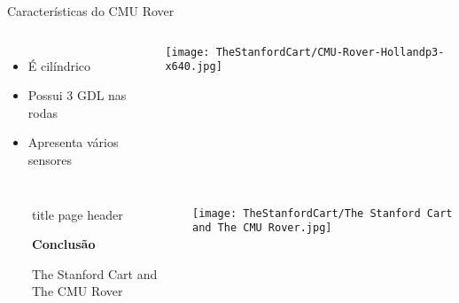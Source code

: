 \begin{frame}[c]{Características do CMU Rover}
    \begin{columns}
        \begin{itemize} 
            \item É cilíndrico
            \item Possui 3 GDL nas rodas
            \item Apresenta vários sensores
        \end{itemize}
            \centering
                \texttt{[image: TheStanfordCart/CMU-Rover-Hollandp3-x640.jpg]}
            \end{columns}
\end{frame}
\begin{frame}
    \begin{columns}
        ~\hfill
            \begin{beamercolorbox}[sep=8em, colsep*=18pt, wd=\textwidth,ht=\paperheight]{title page header}
                \begin{center}
                    \textbf{\huge{Conclusão}}\par
                    \vspace*{0.3cm}
                    The Stanford Cart and The CMU Rover
                \end{center}
            \end{beamercolorbox}%
        \begin{center}
            \texttt{[image: TheStanfordCart/The Stanford Cart and The CMU Rover.jpg]}
        \end{center}
            
    \end{columns}
  
 \end{frame}
